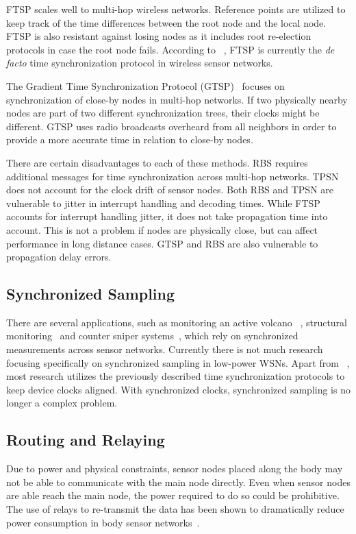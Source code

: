 FTSP scales well to multi-hop wireless networks. Reference points are utilized to keep track of the time differences between the root node and the local node. FTSP is also resistant against losing nodes as it includes root  re-election protocols in case the root node fails. According to ~\cite{synchronization:VHT}, FTSP is currently the \emph{de facto} time synchronization protocol in wireless sensor networks.

The Gradient Time Synchronization Protocol (GTSP)~\cite{synchronization:GTSP} focuses on synchronization of close-by nodes in multi-hop networks. If two physically nearby nodes are part of two different synchronization trees, their clocks might be different. GTSP uses radio broadcasts overheard from all neighbors in order to provide a more accurate time in relation to close-by nodes.

There are certain disadvantages to each of these methods. RBS requires additional messages for time synchronization across multi-hop networks. TPSN does not account for the clock drift of sensor nodes. Both RBS and TPSN are vulnerable to jitter in interrupt handling and decoding times. While FTSP accounts for interrupt handling jitter, it does not take propagation time into account. This is not a problem if nodes are physically close, but can affect performance in long distance cases. GTSP and RBS are also vulnerable to propagation delay errors.

\subsection{Synchronized Sampling}
There are several applications, such as monitoring an active volcano ~\cite{applications:volcano}, structural monitoring~\cite{applications:structural} and counter sniper systems~\cite{applications:sniper}, which rely on synchronized measurements across sensor networks. Currently there is not much research focusing specifically on synchronized sampling in low-power WSNs. Apart from ~\cite{sampling:earthquake}, most research utilizes the previously described time synchronization protocols to keep device clocks aligned. With synchronized clocks, synchronized sampling is no longer a complex problem.

\subsection{Routing and Relaying}
Due to power and physical constraints, sensor nodes placed along the body may not be able to communicate with the main node directly. Even when sensor nodes are able reach the main node, the power required to do so could be prohibitive. The use of relays to re-transmit the data has been shown to dramatically reduce power consumption in body sensor networks~\cite{relay:creepingwave}.

